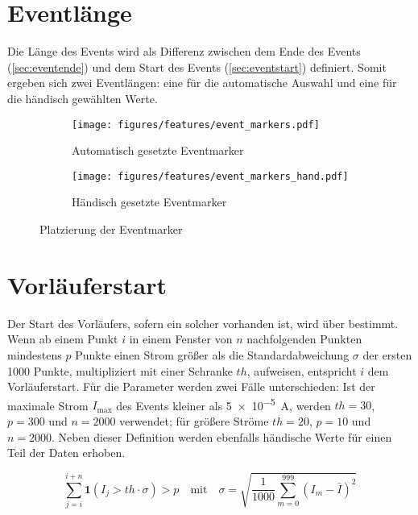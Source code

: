 \section{Eventlänge}
\label{sec:eventlen}
Die Länge des Events wird als Differenz zwischen dem Ende des Events (\ref{sec:eventende}) und dem Start des Events (\ref{sec:eventstart}) definiert. Somit ergeben sich zwei Eventlängen: eine für die automatische Auswahl und eine für die händisch gewählten Werte. 
\begin{figure}[H]
  \centering
  \begin{subfigure}[t]{0.48\textwidth}
    \centering
    \texttt{[image: figures/features/event\_markers.pdf]}
    \caption{Automatisch gesetzte Eventmarker} 
    \label{fig:event_markers_auto}
  \end{subfigure}
  \begin{subfigure}[t]{0.48\textwidth}
    \centering
    \texttt{[image: figures/features/event\_markers\_hand.pdf]}
    \caption{Händisch gesetzte Eventmarker}
    \label{fig:event_markers_hand}
  \end{subfigure}
  \caption{Platzierung der Eventmarker}
  \label{fig:event_markers}
\end{figure}


\section{Vorläuferstart}
\label{sec:preeventstart}
Der Start des Vorläufers, sofern ein solcher vorhanden ist, wird über  bestimmt. Wenn ab einem Punkt \(i\) in einem Fenster von \(n\) nachfolgenden Punkten mindestens \(p\) Punkte einen Strom größer als die Standardabweichung \(\sigma\) der ersten 1000 Punkte, multipliziert mit einer Schranke \(th\), aufweisen, entspricht \(i\) dem Vorläuferstart. Für die Parameter werden zwei Fälle unterschieden: Ist der maximale Strom \(I_{\text{max}}\) des Events kleiner als \SI{5e-5}{\ampere}, werden \(th = 30\), \(p = 300\) und \(n = 2000\) verwendet; für größere Ströme \(th = 20\), \(p = 10\) und \(n = 2000\). Neben dieser Definition werden ebenfalls händische Werte für einen Teil der Daten erhoben.

\begin{equation}
  \sum_{j=i}^{i+n} \mathbf{1}(I_j > th \cdot \sigma) > p 
  \quad \text{mit} \quad
  \sigma = \sqrt{\frac{1}{1000}\sum_{m=0}^{999} (I_m - \bar{I})^2}
  \label{eq:preevent_start} 
\end{equation}

